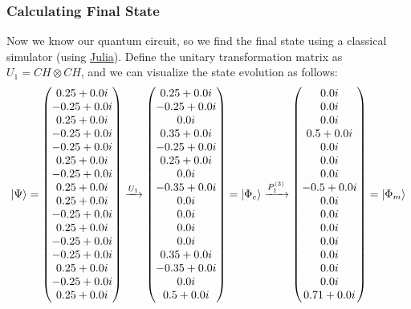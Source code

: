 \documentclass[11pt, oneside, listof=totoc]{scrbook}
\renewcommand{\d}{1}
\begin{document}
\subsubsection{Calculating Final State}

Now we know our quantum circuit, so we find the final state using a classical simulator (using \href{https://julialang.org/}{Julia}). Define the unitary transformation matrix as \(U_1 = CH \otimes CH\), and we can visualize the state evolution as follows:
\begin{equation*}
    \ket{\Psi} = \mqty(
    0.25+0.0 i  \\
    -0.25+0.0 i \\
    0.25+0.0 i  \\
    -0.25+0.0 i \\
    -0.25+0.0 i \\
    0.25+0.0 i  \\
    -0.25+0.0 i \\
    0.25+0.0 i  \\
    0.25+0.0 i  \\
    -0.25+0.0 i \\
    0.25+0.0 i  \\
    -0.25+0.0 i \\
    -0.25+0.0 i \\
    0.25+0.0 i  \\
    -0.25+0.0 i \\
    0.25+0.0 i
    ) \xrightarrow{U_1}
    \mqty(
    0.25+0.0 i \\
    -0.25+0.0 i \\
    0.0 i \\
    0.35+0.0 i \\
    -0.25+0.0 i \\
    0.25+0.0 i \\
    0.0 i \\
    -0.35+0.0 i \\
    0.0 i \\
    0.0 i \\
    0.0 i \\
    0.0 i \\
    0.35+0.0 i \\
    -0.35+0.0 i \\
    0.0 i \\
    0.5+0.0 i
    ) = \ket{\Phi_e} \xrightarrow{P_{\d}^{(3)}}
    \mqty(
    0.0 i \\
    0.0 i \\
    0.0 i \\
    0.5+0.0 i \\
    0.0 i \\
    0.0 i \\
    0.0 i \\
    -0.5+0.0 i \\
    0.0 i \\
    0.0 i \\
    0.0 i \\
    0.0 i \\
    0.0 i \\
    0.0 i \\
    0.0 i \\
    0.71+0.0 i
    ) = \ket{\Phi_m}
\end{equation*}
\end{document}
